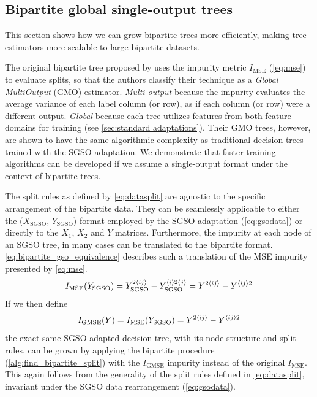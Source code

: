 \subsection{Bipartite global single-output trees}
\label{sec:bgso_trees}

This section shows how we can grow bipartite trees more efficiently, making tree estimators more scalable to large bipartite datasets.

The original bipartite tree proposed by  uses the impurity metric $I_\text{MSE}$ (\autoref{eq:mse}) to evaluate splits, so that the authors classify their technique as a \emph{Global MultiOutput} (GMO) estimator. \emph{Multi-output} because the impurity evaluates the average variance of each label column (or row), as if each column (or row) were a different output. \emph{Global} because each tree utilizes features from both feature domains for training (see \autoref{sec:standard adaptations}).
Their GMO trees, however, are shown to have the same algorithmic complexity as traditional decision trees trained with the SGSO adaptation. We demonstrate that faster training algorithms can be developed if we assume a single-output format under the context of bipartite trees. %

The split rules as defined by \autoref{eq:datasplit} are agnostic to the specific arrangement of the bipartite data. They can be seamlessly applicable to either the ($X_\text{SGSO}$, $Y_\text{SGSO}$) format employed by the SGSO adaptation (\autoref{eq:gsodata}) or directly to the $X_1$, $X_2$ and $Y$ matrices.
Furthermore, the impurity at each node of an SGSO tree,
in many cases can be translated to the bipartite format. \autoref{eq:bipartite_gso_equivalence} describes such a translation of the MSE impurity presented by \autoref{eq:mse}.
%
\begin{equation}
    I_\text{MSE}(Y_\text{SGSO})
        = Y_\text{SGSO}^{2\langle ij\rangle} - Y_\text{SGSO}^{\langle i\rangle 2 \langle j\rangle}
        = Y^{2\langle ij\rangle} - Y^{\langle ij\rangle2}
    \label{eq:bipartite_gso_equivalence}
\end{equation}
% 
If we then define
%
\begin{equation}
    I_\text{GMSE}(Y) = I_\text{MSE}(Y_\text{SGSO})
        = Y^{2\langle ij\rangle} - Y^{\langle ij\rangle2}
    \label{eq:gso_mse}
\end{equation}
%
the exact same SGSO-adapted decision tree, with its node structure and split rules, can be grown by applying the bipartite procedure (\autoref{alg:find_bipartite_split}) with the $I_\text{GMSE}$ impurity instead of the original $I_\text{MSE}$. This again follows from the generality of the split rules defined in \autoref{eq:datasplit}, invariant under the SGSO data rearrangement (\autoref{eq:gsodata}).

